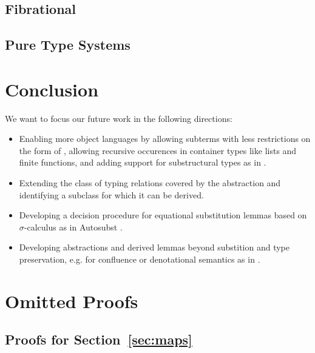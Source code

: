\documentclass[a4paper, UKenglish, cleveref, autoref, thm-restate]{lipics-v2021}
\newenvironment{LibCode*}{%
  \begin{tcolorbox}[%
    colframe=white,%
    boxrule=0.0pt,%
    top=2.5pt,%
    left=2.5pt,%
    bottom=2.5pt,%
    right=2.5pt,%
    boxsep=0pt%
  ]\vspace{-0.2\baselineskip}%
}{%
  \vspace{-1\baselineskip}%
  \end{tcolorbox}%
}
\newcommand*\LibCode[1]{\begin{LibCode*}{#1}\end{LibCode*}}
\newcommand*\ACode[1]{\AgdaFontStyle{\textcolor{mygray}{#1}}}
\newcommand*\ACon[1]{\AgdaInductiveConstructor{#1}}
\begin{document}
  \subsection{Fibrational}
  \cite{DBLP:conf/rta/LicataSR17}

  \subsection{Pure Type Systems}
  \cite{DBLP:conf/esop/BarendregtH90, berarditowards, terlouw1989een}

  \section{Conclusion}
  \label{sec:conclusion}
  We want to focus our future work in the following directions:
  \begin{itemize}
  \item
    Enabling more object languages by allowing subterms with less
    restrictions on the form of \ACode{S}, allowing recursive
    occurences in container types like lists and finite functions, and
    adding support for substructural types as in
    \cite{DBLP:journals/corr/abs-2005-02247}.
  \item
    Extending the class of typing relations covered by
    the \ACode{\ACon{TTraversal}} abstraction and identifying
    a subclass for which it can be derived.
  \item
    Developing a decision procedure for equational
    substitution lemmas based on $\sigma$-calculus as in Autosubst
    \cite{DBLP:conf/itp/SchaferTS15, DBLP:conf/cpp/StarkSK19}.
  \item
    Developing abstractions and derived lemmas beyond substition and
    type preservation, e.g. for confluence or denotational semantics
    as in \cite{DBLP:journals/pacmpl/AllaisA0MM18}.
  \end{itemize}

  

  \clearpage
  \appendix
  \onecolumn

  \section{Omitted Proofs}
  \label{sec:proofs}

  \subsection{Proofs for Section~\ref{sec:maps}}
  \LibCode\KIdLift
  \LibCode\KIdLiftProof
\end{document}
